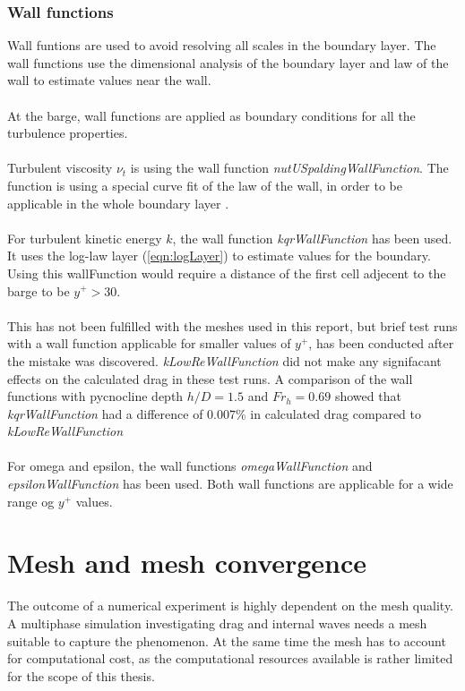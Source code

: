 \documentclass[a4paper, 12pt]{report}
\begin{document}
\subsubsection{Wall functions}
Wall funtions are used to avoid resolving all scales in the boundary layer. The wall functions use the dimensional analysis of the boundary layer and law of the wall to estimate values near the wall.\\
\\
At the barge, wall functions are applied as boundary conditions for all the turbulence properties.\\
\\
Turbulent viscosity $\nu_t$ is using the wall function \textit{nutUSpaldingWallFunction}. The function is using a special curve fit of the law of the wall, in order to be applicable in the whole boundary layer \cite{Spalding}.\\
\\
For turbulent kinetic energy $k$, the wall function \textit{kqrWallFunction} has been used. It uses the log-law layer (\ref{eqn:logLayer}) to estimate values for the boundary. Using this wallFunction would require a distance of the first cell adjecent to the barge to be $y^+ > 30$.\\
\\
This has not been fulfilled with the meshes used in this report, but brief test runs with a wall function applicable for smaller values of $y^+$, has been conducted after the mistake was discovered. \textit{kLowReWallFunction} did not make any signifacant effects on the calculated drag in these test runs. A comparison of the wall functions with pycnocline depth $h/D=1.5$ and $Fr_h=0.69$ showed that \textit{kqrWallFunction} had a difference of $0.007\%$ in calculated drag compared to \textit{kLowReWallFunction}\\
\\
For omega and epsilon, the wall functions \textit{omegaWallFunction} and \textit{epsilonWallFunction} has been used. Both wall functions are applicable for a wide range og $y^+$ values.
\section{Mesh and mesh convergence}
The outcome of a numerical experiment is highly dependent on the mesh quality. A multiphase simulation investigating drag and internal waves needs a mesh suitable to capture the phenomenon. At the same time the mesh has to account for computational cost, as the computational resources available is rather limited for the scope of this thesis.
\end{document}
